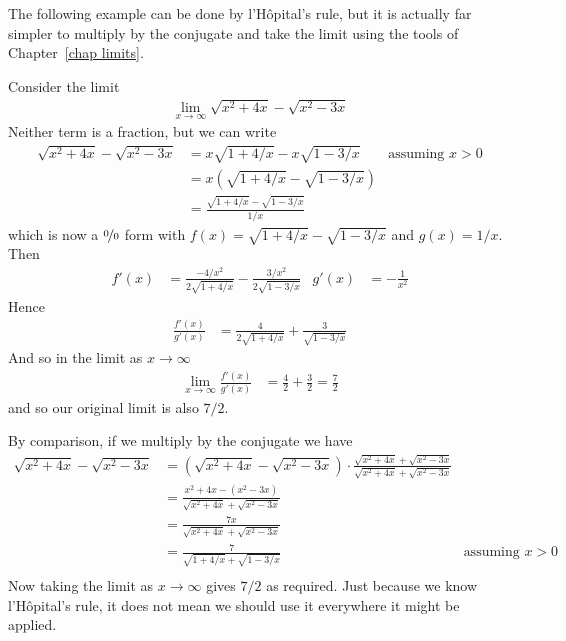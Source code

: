\begin{enumerate}[(a)]
The following example can be done by l'H\^opital's rule, but it is actually far simpler
to multiply by the conjugate and take the limit using the tools of
Chapter~\ref{chap limits}.
\begin{eg}
Consider the limit
\begin{align*}
  \lim_{x\to \infty} \sqrt{x^2+4x}-\sqrt{x^2-3x}
\end{align*}
Neither term is a fraction, but we can write
\begin{align*}
\sqrt{x^2+4x}-\sqrt{x^2-3x}
&= x\sqrt{1+4/x}-x\sqrt{1-3/x}  & \text{assuming $x>0$}\\
&= x \left( \sqrt{1+4/x}-\sqrt{1-3/x} \right)\\
&= \frac{\sqrt{1+4/x}-\sqrt{1-3/x}}{1/x}
\end{align*}
which is now a $\nicefrac00$ form with $f(x)=\sqrt{1+4/x}-\sqrt{1-3/x}$ and $g(x)=1/x$.
Then
\begin{align*}
f'(x) &= \frac{-4/x^2}{2\sqrt{1+4/x}} - \frac{3/x^2}{2\sqrt{1-3/x}} &
g'(x) &= - \frac{1}{x^2}
\end{align*}
Hence
\begin{align*}
  \frac{f'(x)}{g'(x)} &= \frac{4}{2\sqrt{1+4/x}} + \frac{3}{\sqrt{1-3/x}}
\end{align*}
And so in the limit as $x\to \infty$
\begin{align*}
  \lim_{x\to \infty} \frac{f'(x)}{g'(x)} &= \frac{4}{2}+\frac{3}{2} =
\frac{7}{2}
\end{align*}
and so our original limit is also $7/2$.

By comparison, if we multiply by the conjugate we have
\begin{align*}
\sqrt{x^2+4x}-\sqrt{x^2-3x}
&= \left( \sqrt{x^2+4x}-\sqrt{x^2-3x}\right)
\cdot \frac{\sqrt{x^2+4x}+\sqrt{x^2-3x}}{\sqrt{x^2+4x}+\sqrt{x^2-3x}}\\
&= \frac{ x^2+4x - (x^2-3x)}{\sqrt{x^2+4x}+\sqrt{x^2-3x}}\\
&= \frac{ 7x}{\sqrt{x^2+4x}+\sqrt{x^2-3x}}\\
&= \frac{7}{\sqrt{1+4/x}+\sqrt{1-3/x}} & \text{assuming $x>0$}\\
\end{align*}
Now taking the limit as $x\to\infty$ gives $7/2$ as required. Just because we know
l'H\^opital's rule, it does not mean we should use it everywhere it might be applied.
\end{eg}



\goodbreak



\end{enumerate}
